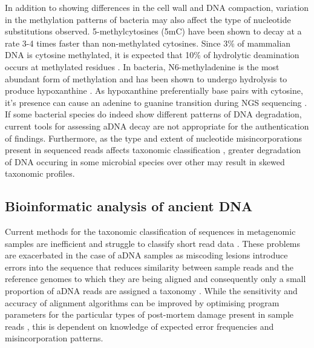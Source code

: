 \documentclass[12pt, a4paper]{article}
\begin{document}
In addition to showing differences in the cell wall and DNA compaction, variation in the methylation patterns of bacteria may also affect the type of nucleotide substitutions observed. 
5-methylcytosines (5mC) have been shown to decay at a rate 3-4 times faster than non-methylated cytosines. Since 3\% of mammalian DNA is cytosine methylated, it is expected that 10\% of hydrolytic deamination occurs at methylated residues \cite{Lindahl:1993aa}. 
In bacteria, N6-methyladenine is the most abundant form of methylation and has been shown to undergo hydrolysis to produce hypoxanthine \cite{OBrown:2016aa}. 
As hypoxanthine preferentially base pairs with cytosine, it's presence can cause an adenine to guanine transition during NGS sequencing \cite{Stiller:2006aa}.
If some bacterial species do indeed show different patterns of DNA degradation, current tools for assessing aDNA decay are not appropriate for the authentication of findings. 
Furthermore, as the type and extent of nucleotide misincorporations present in sequenced reads affects taxonomic classification \cite{Kircher:2012aa}, greater degradation of DNA occuring in some microbial species over other may result in skewed taxonomic profiles.  

\subsection{Bioinformatic analysis of ancient DNA}\label{sec:bioinformatics}
Current methods for the taxonomic classification of sequences in metagenomic samples are inefficient and struggle to classify short read data \cite{Segata:2012aa}. 
These problems are exacerbated in the case of aDNA samples as miscoding lesions introduce errors into the sequence that reduces similarity between sample reads and the reference genomes to which they are being aligned \cite{Schubert:2012aa} and consequently only a small proportion of aDNA reads are assigned a taxonomy \cite{Fosso:2017aa}.
While the sensitivity and accuracy of alignment algorithms can be improved by optimising program parameters for the particular types of post-mortem damage present in sample reads \cite{Schubert:2012aa}, this is dependent on knowledge of expected error frequencies and misincorporation patterns.
\end{document}

